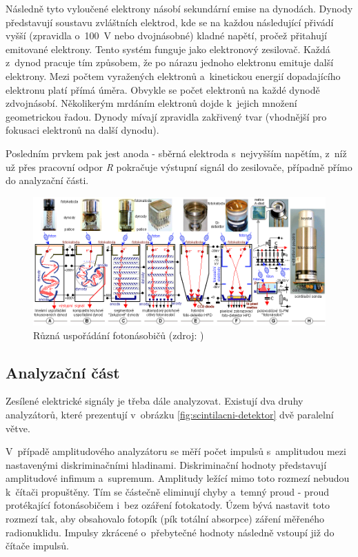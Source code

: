 Následně tyto vyloučené elektrony násobí sekundární emise na dynodách. Dy\-nody představují soustavu
zvláštních elektrod, kde se na každou následující přivádí vyšší (zpravidla o~100~V nebo
dvojnásobné) kladné napětí, pročež přitahují emitované elektrony. Tento systém funguje
jako elektronový zesilovač. Každá z~dynod pracuje tím způsobem, že po nárazu jednoho elektronu emituje
další elektrony. Mezi počtem vyražených elektronů a~kinetickou energií dopadajícího elektronu
platí přímá úměra. Obvykle se počet elektronů na každé dynodě zdvojnásobí. Několikerým
mrdáním elektronů dojde k~jejich množení geometrickou řadou. Dynody mívají zpravidla
zakřivený tvar (vhodnější pro fokusaci elektronů na další dynodu). 

Posledním prvkem pak jest anoda - sběrná elektroda s~nejvyšším napětím, z~níž už přes pracovní
odpor \textit{R} pokračuje výstupní signál do zesilovače, případně přímo do analyzační části. 

  \begin{figure}[H]
   \centering
	\includegraphics[scale=0.5]{./pictures/fotonasobice.png}
	\caption[Různá uspořádání fotonásobičů]{Různá uspořádání fotonásobičů
	(zdroj: \cite{spektrometrie})}
      \label{fig:fotonasobice}
  \end{figure}

\subsection{Analyzační část}
\label{analyzator}

Zesílené elektrické signály je třeba dále analyzovat. Existují dva druhy analyzátorů,
které prezentují v~obrázku \ref{fig:scintilacni-detektor} dvě paralelní větve. 

V~případě amplitudového analyzátoru se měří počet impulsů s~amplitudou mezi nastavenými
diskriminačními hladinami. Diskriminační hodnoty představují amplitudové infimum a~supremum.
Amplitudy ležící mimo toto rozmezí nebudou k~čítači propuštěny. Tím se částečně
eliminují chyby a~temný proud - proud protékající fotonásobičem i~bez ozáření fotokatody.
Územ bývá nastavit toto rozmezí tak, aby obsahovalo fotopík (pík totální absorpce) záření
měřeného radionuklidu. Impulsy zkrácené o~přebytečné hodnoty následně vstoupí již do čítače impulsů. 

